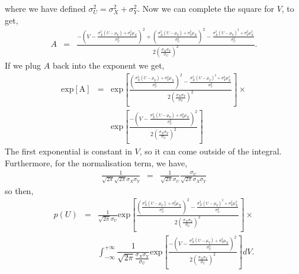 \begin{tcolorbox}[colback=backblue]
where we have defined $\sigma_{U}^{2}=\sigma_{X}^{2}+\sigma_{Y}^{2}$. Now we can complete the square for $V$, to get, 
\begin{eqnarray}
    A & = & \frac{ 
    -\left(V-\frac{\sigma_{X}^{2}(U-\mu_{Y})+\sigma_{Y}^{2}\mu_{X}}{\sigma_{U}^{2}}\right)^{2} +\left(\frac{\sigma_{X}^{2}(U-\mu_{Y})+\sigma_{Y}^{2}\mu_{X}}{\sigma_{U}^{2}}\right)^{2} 
    - \frac{\sigma_{X}^{2}(U-\mu_{Y})^{2}+\sigma_{Y}^{2}\mu_{X}^{2}}{\sigma_{U}^{2}}}
    {2\left(\frac{\sigma_{X} \sigma_{Y}}{\sigma_{U}}\right)^{2}}.
\end{eqnarray}
If we plug $A$ back into the exponent we get, 
\begin{eqnarray}
  \mathrm{exp[A]} & = & \mathrm{exp}\left[\frac{ \left(\frac{\sigma_{X}^{2}(U-\mu_{Y})+\sigma_{Y}^{2}\mu_{X}}{\sigma_{U}^{2}}\right)^{2} 
    - \frac{\sigma_{X}^{2}(U-\mu_{Y})^{2}+\sigma_{Y}^{2}\mu_{X}^{2}}{\sigma_{U}^{2}}}
    {2\left(\frac{\sigma_{X} \sigma_{Y}}{\sigma_{U}}\right)^{2}} \right] \times \\ 
    & & 
    \mathrm{exp}\left[\frac{ 
    -\left(V-\frac{\sigma_{X}^{2}(U-\mu_{Y})+\sigma_{Y}^{2}\mu_{X}}{\sigma_{U}^{2}}\right)^{2}}{2\left(\frac{\sigma_{X} \sigma_{Y}}{\sigma_{U}}\right)^{2}}\right]
\end{eqnarray}
The first exponential is constant in $V$, so it can come outside of the integral. Furthermore, for the normalisation term, we have, 
\begin{eqnarray}
\frac{1}{\sqrt{2\pi}\sqrt{2\pi}\sigma_{X}\sigma_{Y}} & = & \frac{1}{\sqrt{2\pi}\sigma_{U}} \frac{\sigma_{U}}{\sqrt{2\pi}\sigma_{X}\sigma_{Y}}
\end{eqnarray}
so then, 
\begin{eqnarray}
p(U) & = & \frac{1}{\sqrt{2\pi}\sigma_{U}}\mathrm{exp}\left[\frac{ \left(\frac{\sigma_{X}^{2}(U-\mu_{Y})+\sigma_{Y}^{2}\mu_{X}}{\sigma_{U}^{2}}\right)^{2} 
    - \frac{\sigma_{X}^{2}(U-\mu_{Y})^{2}+\sigma_{Y}^{2}\mu_{X}^{2}}{\sigma_{U}^{2}}}
    {2\left(\frac{\sigma_{X} \sigma_{Y}}{\sigma_{U}}\right)^{2}} \right] \times \\ 
    & & 
    \int_{-\infty}^{+\infty}\dfrac{1}{\sqrt{2\pi}\frac{\sigma_{X}{\sigma_{Y}}}{\sigma_{U}}}
    \mathrm{exp}\left[\frac{ 
    -\left(V-\frac{\sigma_{X}^{2}(U-\mu_{Y})+\sigma_{Y}^{2}\mu_{X}}{\sigma_{U}^{2}}\right)^{2}}{2\left(\frac{\sigma_{X} \sigma_{Y}}{\sigma_{U}}\right)^{2}}\right]dV.
\end{eqnarray}
\end{tcolorbox}

